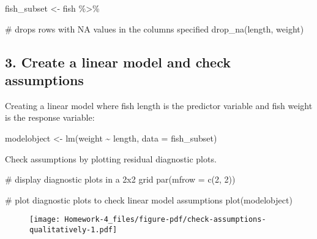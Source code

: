 \documentclass[
  letterpaper,
  DIV=11,
  numbers=noendperiod]{scrartcl}
\newenvironment{Shaded}{\begin{snugshade}}{\end{snugshade}}
\newcommand{\AttributeTok}[1]{\textcolor[rgb]{0.40,0.45,0.13}{#1}}
\newcommand{\CommentTok}[1]{\textcolor[rgb]{0.37,0.37,0.37}{#1}}
\newcommand{\DecValTok}[1]{\textcolor[rgb]{0.68,0.00,0.00}{#1}}
\newcommand{\FunctionTok}[1]{\textcolor[rgb]{0.28,0.35,0.67}{#1}}
\newcommand{\NormalTok}[1]{\textcolor[rgb]{0.00,0.23,0.31}{#1}}
\newcommand{\OtherTok}[1]{\textcolor[rgb]{0.00,0.23,0.31}{#1}}
\newcommand{\SpecialCharTok}[1]{\textcolor[rgb]{0.37,0.37,0.37}{#1}}
\begin{document}
\begin{Shaded}
\begin{Highlighting}[]
\NormalTok{fish\_subset }\OtherTok{\textless{}{-}}\NormalTok{ fish }\SpecialCharTok{\%\textgreater{}\%} 
  
  \CommentTok{\# drops rows with NA values in the columns specified}
  \FunctionTok{drop\_na}\NormalTok{(length, weight)}
\end{Highlighting}
\end{Shaded}

\hypertarget{create-a-linear-model-and-check-assumptions}{%
\subsection{3. Create a linear model and check
assumptions}\label{create-a-linear-model-and-check-assumptions}}

Creating a linear model where fish length is the predictor variable and
fish weight is the response variable:

\begin{Shaded}
\begin{Highlighting}[]
\NormalTok{modelobject }\OtherTok{\textless{}{-}} \FunctionTok{lm}\NormalTok{(weight }\SpecialCharTok{\textasciitilde{}}\NormalTok{ length, }\AttributeTok{data =}\NormalTok{ fish\_subset)}
\end{Highlighting}
\end{Shaded}

Check assumptions by plotting residual diagnostic plots.

\begin{Shaded}
\begin{Highlighting}[]
\CommentTok{\# display diagnostic plots in a 2x2 grid}
\FunctionTok{par}\NormalTok{(}\AttributeTok{mfrow =} \FunctionTok{c}\NormalTok{(}\DecValTok{2}\NormalTok{, }\DecValTok{2}\NormalTok{))}

\CommentTok{\# plot diagnostic plots to check linear model assumptions}
\FunctionTok{plot}\NormalTok{(modelobject)}
\end{Highlighting}
\end{Shaded}

\begin{figure}[H]

{\centering \texttt{[image: Homework-4\_files/figure-pdf/check-assumptions-qualitatively-1.pdf]}

}

\end{figure}
\end{document}
